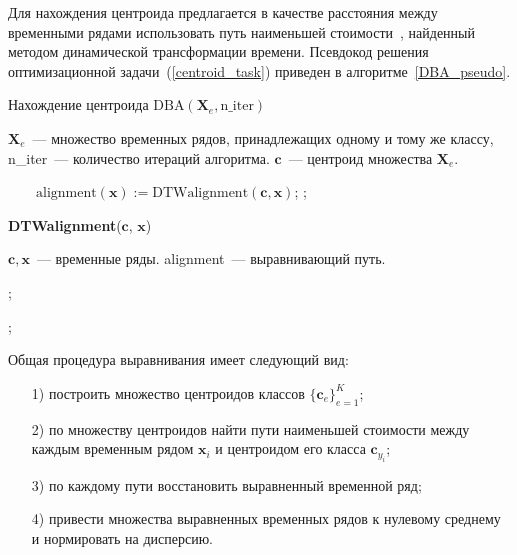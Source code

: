 Для нахождения центроида предлагается в качестве расстояния между временными рядами использовать путь наименьшей стоимости~\cite{goncharov2015cost}, найденный методом динамической трансформации времени.
Псевдокод решения оптимизационной задачи~(\ref{centroid_task}) приведен в алгоритме~\ref{DBA_pseudo}.

\begin{algorithm}
	\caption{Нахождение центроида $\text{DBA}(\mathbf{X}_e, \text{n\_iter})$}
	\label{DBA_pseudo}
	\begin{algorithmic}[1]
		\REQUIRE $\mathbf{X}_e$~--- множество временных рядов, принадлежащих одному и тому же классу, n\_iter~--- количество итераций алгоритма.
		\ENSURE $\mathbf{c}$~--- центроид множества $\mathbf{X}_e$.
		
		\STATEx $ \quad \quad \text{alignment}(\mathbf{x}) := \text{DTWalignment}(\mathbf{c}, \mathbf{x})$;
		\ENDFOR
		;
		\ENDFOR
	\end{algorithmic}

	\textbf{DTWalignment}($\mathbf{c}$, $\mathbf{x}$)
	\begin{algorithmic}[1]
		\REQUIRE $\mathbf{c}, \mathbf{x}$~--- временные ряды.
		\ENSURE alignment~--- выравнивающий путь.
		
		;
		
		;
	\end{algorithmic}
\end{algorithm}
\newpage
Общая процедура выравнивания имеет следующий вид:
\begin{itemize}
	\item[1)]
	построить множество центроидов классов $\{\mathbf{c}_e\}_{e = 1}^K$;
	\item[2)]
	по множеству центроидов найти пути наименьшей стоимости между каждым
	временным рядом $\mathbf{x}_i$ и центроидом его класса $\mathbf{c}_{y_i}$;
	\item[3)]
	по каждому пути восстановить выравненный временной ряд;
	\item[4)]
	привести множества выравненных временных рядов к нулевому среднему и нормировать на дисперсию.
\end{itemize}


